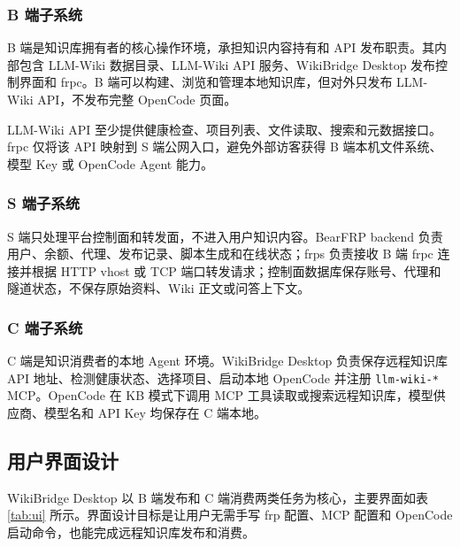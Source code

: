 \documentclass[UTF8,a4paper,12pt,fontset=fandol]{ctexart}
\newcommand{\code}[1]{\texttt{\footnotesize #1}}
\begin{document}
\subsubsection{B 端子系统}
B 端是知识库拥有者的核心操作环境，承担知识内容持有和 API 发布职责。其内部包含 LLM-Wiki 数据目录、LLM-Wiki API 服务、WikiBridge Desktop 发布控制界面和 frpc。B 端可以构建、浏览和管理本地知识库，但对外只发布 LLM-Wiki API，不发布完整 OpenCode 页面。

LLM-Wiki API 至少提供健康检查、项目列表、文件读取、搜索和元数据接口。frpc 仅将该 API 映射到 S 端公网入口，避免外部访客获得 B 端本机文件系统、模型 Key 或 OpenCode Agent 能力。

\subsubsection{S 端子系统}
S 端只处理平台控制面和转发面，不进入用户知识内容。BearFRP backend 负责用户、余额、代理、发布记录、脚本生成和在线状态；frps 负责接收 B 端 frpc 连接并根据 HTTP vhost 或 TCP 端口转发请求；控制面数据库保存账号、代理和隧道状态，不保存原始资料、Wiki 正文或问答上下文。

\subsubsection{C 端子系统}
C 端是知识消费者的本地 Agent 环境。WikiBridge Desktop 负责保存远程知识库 API 地址、检测健康状态、选择项目、启动本地 OpenCode 并注册 \code{llm-wiki-*} MCP。OpenCode 在 KB 模式下调用 MCP 工具读取或搜索远程知识库，模型供应商、模型名和 API Key 均保存在 C 端本地。

\subsection{用户界面设计}
WikiBridge Desktop 以 B 端发布和 C 端消费两类任务为核心，主要界面如表 \ref{tab:ui} 所示。界面设计目标是让用户无需手写 frp 配置、MCP 配置和 OpenCode 启动命令，也能完成远程知识库发布和消费。
\end{document}
